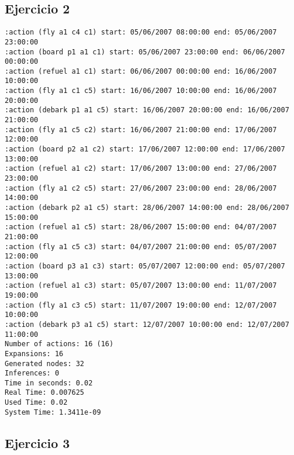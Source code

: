 \documentclass{article}
\begin{document}
\subsection*{Ejercicio 2}

\begin{lstlisting}
:action (fly a1 c4 c1) start: 05/06/2007 08:00:00 end: 05/06/2007 23:00:00
:action (board p1 a1 c1) start: 05/06/2007 23:00:00 end: 06/06/2007 00:00:00
:action (refuel a1 c1) start: 06/06/2007 00:00:00 end: 16/06/2007 10:00:00
:action (fly a1 c1 c5) start: 16/06/2007 10:00:00 end: 16/06/2007 20:00:00
:action (debark p1 a1 c5) start: 16/06/2007 20:00:00 end: 16/06/2007 21:00:00
:action (fly a1 c5 c2) start: 16/06/2007 21:00:00 end: 17/06/2007 12:00:00
:action (board p2 a1 c2) start: 17/06/2007 12:00:00 end: 17/06/2007 13:00:00
:action (refuel a1 c2) start: 17/06/2007 13:00:00 end: 27/06/2007 23:00:00
:action (fly a1 c2 c5) start: 27/06/2007 23:00:00 end: 28/06/2007 14:00:00
:action (debark p2 a1 c5) start: 28/06/2007 14:00:00 end: 28/06/2007 15:00:00
:action (refuel a1 c5) start: 28/06/2007 15:00:00 end: 04/07/2007 21:00:00
:action (fly a1 c5 c3) start: 04/07/2007 21:00:00 end: 05/07/2007 12:00:00
:action (board p3 a1 c3) start: 05/07/2007 12:00:00 end: 05/07/2007 13:00:00
:action (refuel a1 c3) start: 05/07/2007 13:00:00 end: 11/07/2007 19:00:00
:action (fly a1 c3 c5) start: 11/07/2007 19:00:00 end: 12/07/2007 10:00:00
:action (debark p3 a1 c5) start: 12/07/2007 10:00:00 end: 12/07/2007 11:00:00
Number of actions: 16 (16)
Expansions: 16
Generated nodes: 32
Inferences: 0
Time in seconds: 0.02
Real Time: 0.007625
Used Time: 0.02
System Time: 1.3411e-09
\end{lstlisting}

\subsection*{Ejercicio 3}
\end{document}
